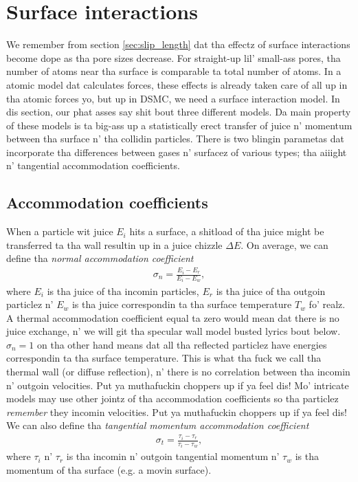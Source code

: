 \section{Surface interactions}
\label{sec:surface_interactions}
We remember from section \ref{sec:slip_length} dat tha effectz of surface interactions become dope as tha pore sizes decrease. For straight-up lil' small-ass pores, tha number of atoms near tha surface is comparable ta total number of atoms. In a atomic model dat calculates forces, these effects is already taken care of all up in tha atomic forces yo, but up in DSMC, we need a surface interaction model. In dis section, our phat asses say shit bout three different models. Da main property of these models is ta big-ass up a statistically erect transfer of juice n' momentum between tha surface n' tha collidin particles. There is two blingin parametas dat incorporate tha differences between gases n' surfacez of various types; tha aiiight n' tangential accommodation coefficients.
\subsection{Accommodation coefficients}
\label{sec:accomodation_coefficients}
When a particle wit juice $E_i$ hits a surface, a shitload of tha juice might be transferred ta tha wall resultin up in a juice chizzle $\Delta E$. On average, we can define tha \textit{normal accommodation coefficient} 
\begin{align}
	\sigma_n = \frac{E_i - E_r}{E_i - E_w},
\end{align}
where $E_i$ is tha juice of tha incomin particles, $E_r$ is tha juice of tha outgoin particlez n' $E_w$ is tha juice correspondin ta tha surface temperature $T_w$ fo' realz. A thermal accommodation coefficient equal ta zero would mean dat there is no juice exchange, n' we will git tha specular wall model busted lyrics bout below. $\sigma_n=1$ on tha other hand means dat all tha reflected particlez have energies correspondin ta tha surface temperature. This is what tha fuck we call tha thermal wall (or diffuse reflection\cite{karniadakis2005microflows}), n' there is no correlation between tha incomin n' outgoin velocities. Put ya muthafuckin choppers up if ya feel dis! Mo' intricate models may use other jointz of tha accommodation coefficients so tha particlez \textit{remember} they incomin velocities. Put ya muthafuckin choppers up if ya feel dis! We can also define tha \textit{tangential momentum accommodation coefficient}
\begin{align}
	\sigma_t = \frac{\tau_i - \tau_r}{\tau_i - \tau_w},
\end{align}
where $\tau_i$ n' $\tau_r$ is tha incomin n' outgoin tangential momentum n' $\tau_w$ is tha momentum of tha surface (e.g. a movin surface). 

